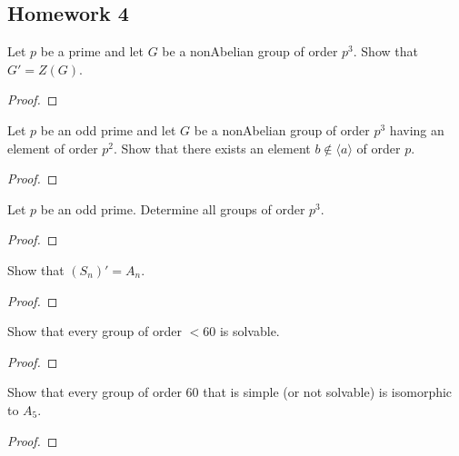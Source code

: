 \subsection{Homework 4}
\begin{problem}
  Let $p$ be a prime and let $G$ be a nonAbelian group of order $p^3$. Show
  that $G'=Z(G)$.
\end{problem}
\begin{proof}
\end{proof}

\begin{problem}
  Let $p$ be an odd prime and let $G$ be a nonAbelian group of order $p^3$
  having an element of order $p^2$. Show that there exists an element
  $b\notin\langle a \rangle$ of order $p$.
\end{problem}
\begin{proof}
\end{proof}

\begin{problem}
  Let $p$ be an odd prime. Determine all groups of order $p^3$.
\end{problem}
\begin{proof}
\end{proof}

\begin{problem}
  Show that $(S_n)'=A_n$.
\end{problem}
\begin{proof}
\end{proof}

\begin{problem}
  Show that every group of order $<60$ is solvable.
\end{problem}
\begin{proof}
\end{proof}

\begin{problem}
  Show that every group of order $60$ that is simple (or not solvable) is
  isomorphic to $A_5$.
\end{problem}
\begin{proof}
\end{proof}

